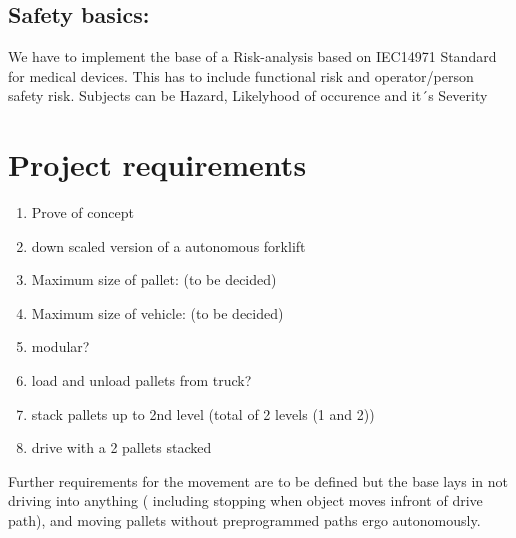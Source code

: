 \documentclass[11pt]{article}
\begin{document}
\subsection{Safety basics:}
We have to implement the base of a Risk-analysis based on IEC14971 Standard for medical devices.
This has to include functional risk and operator/person safety risk. Subjects can be Hazard, Likelyhood
of occurence and  it´s Severity

\section{Project requirements}
\begin{enumerate}
    \item Prove of concept
    \item down scaled version of a autonomous forklift
    \item Maximum size of pallet: (to be decided)
    \item Maximum size of vehicle: (to be decided)
    \item modular?
    \item load and unload pallets from truck?
    \item stack pallets up to 2nd level (total of 2 levels (1 and 2))
    \item drive with a 2 pallets stacked
\end{enumerate}
Further requirements for the movement are to be defined but the base lays in not driving
into anything ( including stopping when object moves infront of drive path), and moving
pallets without preprogrammed paths ergo autonomously.
\end{document}
